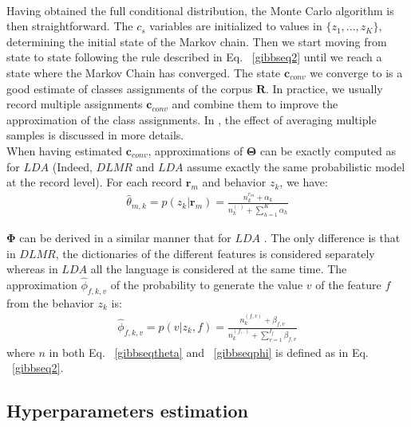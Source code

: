 \\Having obtained the full conditional distribution, the Monte Carlo algorithm is then straightforward. The $c_{s}$ variables are initialized to values in $\{z_{1},...,z_{K}\}$, determining the initial state of the Markov chain. Then we start moving from state to state following the rule described in Eq. ~\eqref{gibbseq2} until we reach a state where the Markov Chain has converged. The state $\mathbf{c}_{conv}$ we converge to is a good estimate of classes assignments of the corpus $\mathbf{R}$. In practice, we usually record multiple assignments $\mathbf{c}_{conv}$ and combine them to improve the approximation of the class assignments. In \cite{inferencecomp}, the effect of averaging multiple samples is discussed in more details.
\\When having estimated $\mathbf{c}_{conv}$, approximations of $\boldsymbol{\Theta }$ can be exactly computed as for $LDA$ \cite{gibbs} (Indeed, $DLMR$ and $LDA$ assume exactly the same probabilistic model at the record level). For each record $\mathbf{r}_{m}$ and behavior $z_{k}$, we have:
\begin{equation}\label{gibbseqtheta}
\begin{split} 
\widehat{\theta}_{m,k}= p(z_{k}|\mathbf{r}_{m})= \frac{n^{r_{m}}_{k}+\alpha _{k}}{n^{(.)}_{k}+\sum_{h=1}^{K}\alpha _{h}}
\end{split} 
\end{equation}

$\boldsymbol{\Phi }$ can be derived in a similar manner that for $LDA$ \cite{gibbs}. The only difference is that in $DLMR$, the dictionaries of the different features is considered separately whereas in $LDA$ all the language is considered at the same time. The approximation $\widehat{\phi}_{f,k,v}$ of the probability to generate the value $v$ of the feature $f$ from the behavior $z_{k}$ is:
\begin{equation}\label{gibbseqphi}
\begin{split} 
\widehat{\phi}_{f,k,v}= p(v|z_{k},f)= \frac{n^{(f,v)}_{k}+\beta _{f,v}}{n^{(f,.)}_{k}+\sum_{v=1}^{I_{f}}\beta _{f,v}}
\end{split} 
\end{equation}
where $n$ in both Eq. ~\eqref{gibbseqtheta} and ~\eqref{gibbseqphi} is defined as in Eq. ~\eqref{gibbseq2}.


\subsection{Hyperparameters estimation}


